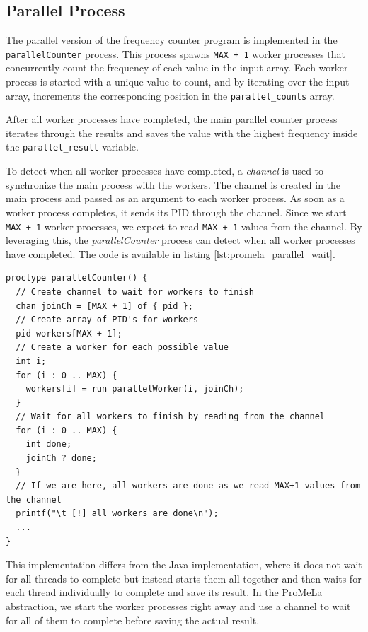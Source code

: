\documentclass[a4paper, 11pt]{article}
\begin{document}
\subsection{Parallel Process}
\label{sec:parallel_process}

The parallel version of the frequency counter program is implemented in the \texttt{parallelCounter} process. This process spawns \texttt{MAX + 1} worker processes that concurrently count the frequency of each value in the input array. Each worker process is started with a unique value to count, and by iterating over the input array, increments the corresponding position in the \texttt{parallel\_counts} array.

After all worker processes have completed, the main parallel counter process iterates through the results and saves the value with the highest frequency inside the \texttt{parallel\_result} variable.

To detect when all worker processes have completed, a \textit{channel} is used to synchronize the main process with the workers. The channel is created in the main process and passed as an argument to each worker process. As soon as a worker process completes, it sends its PID through the channel. Since we start \texttt{MAX + 1} worker processes, we expect to read \texttt{MAX + 1} values from the channel. By leveraging this, the \textit{parallelCounter} process can detect when all worker processes have completed. The code is available in listing \ref{lst:promela_parallel_wait}.

\begin{lstlisting}[language=Promela, caption={ProMeLa parallel frequency counter - worker synchronization with channel}, label={lst:promela_parallel_wait}]
proctype parallelCounter() {
  // Create channel to wait for workers to finish
  chan joinCh = [MAX + 1] of { pid };
  // Create array of PID's for workers
  pid workers[MAX + 1];
  // Create a worker for each possible value
  int i;
  for (i : 0 .. MAX) {
    workers[i] = run parallelWorker(i, joinCh);
  }
  // Wait for all workers to finish by reading from the channel
  for (i : 0 .. MAX) {
    int done;
    joinCh ? done;
  }
  // If we are here, all workers are done as we read MAX+1 values from the channel
  printf("\t [!] all workers are done\n");
  ...
}
\end{lstlisting}

\noindent This implementation differs from the Java implementation, where it does not wait for all threads to complete but instead starts them all together and then waits for each thread individually to complete and save its result. In the ProMeLa abstraction, we start the worker processes right away and use a channel to wait for all of them to complete before saving the actual result.
\end{document}
